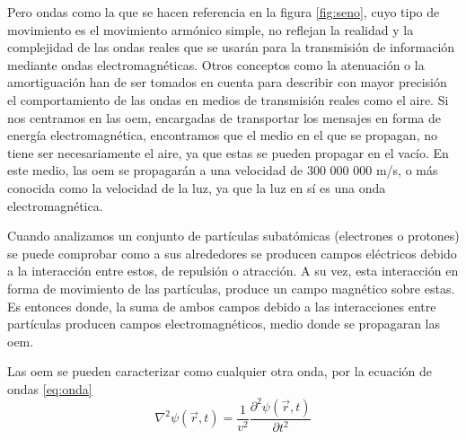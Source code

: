 \par Pero ondas como la que se hacen referencia en la figura \ref{fig:seno}, cuyo tipo de movimiento es el movimiento armónico simple, no reflejan la realidad y la complejidad de las ondas reales que se usarán para la transmisión de información mediante ondas electromagnéticas. Otros conceptos como la atenuación o la amortiguación han de ser tomados en cuenta para describir con mayor precisión el comportamiento de las ondas en medios de transmisión reales como el aire. Si nos centramos en las \gls{oem}, encargadas de transportar los mensajes en forma de energía electromagnética, encontramos que el medio en el que se propagan, no tiene  ser necesariamente el aire, ya que estas se pueden propagar en el vacío. En este medio, las \gls{oem} se propagarán a una velocidad de 300 000 000 m/s, o más conocida como la velocidad de la luz, ya que la luz en sí es una onda electromagnética. 
\\
\par Cuando analizamos un conjunto de partículas subatómicas (electrones o protones) se puede comprobar como a sus alrededores se producen campos eléctricos debido a la interacción entre estos, de repulsión o atracción. A su vez, esta interacción en forma de movimiento de las partículas, produce un campo magnético sobre estas. Es entonces donde, la suma de ambos campos debido a las interacciones entre partículas producen campos electromagnéticos, medio donde se propagaran las \gls{oem}.
\\
\par Las \gls{oem} se pueden caracterizar como cualquier otra onda, por la ecuación de ondas \ref{eq:onda}
\begin{equation}
	\nabla^2\psi(\vec r, t)=\dfrac
1{v^2}\dfrac{\partial^2\psi
(\vec r,t)}{\partial t^2}
	\label{eq: onda}
\end{equation}

